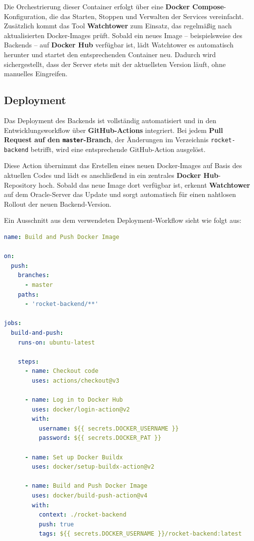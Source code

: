 \documentclass[11pt,a4paper]{article}
\begin{document}
Die Orchestrierung dieser Container erfolgt über eine \textbf{Docker Compose}-Konfiguration, die das Starten, Stoppen und Verwalten der Services vereinfacht. Zusätzlich kommt das Tool \textbf{Watchtower} zum Einsatz, das regelmäßig nach aktualisierten Docker-Images prüft. Sobald ein neues Image – beispielsweise des Backends – auf \textbf{Docker Hub} verfügbar ist, lädt Watchtower es automatisch herunter und startet den entsprechenden Container neu. Dadurch wird sichergestellt, dass der Server stets mit der aktuellsten Version läuft, ohne manuelles Eingreifen.

\subsection{Deployment}

Das Deployment des Backends ist vollständig automatisiert und in den Entwicklungsworkflow über \textbf{GitHub-Actions}\cite{github} integriert. Bei jedem \textbf{Pull Request auf den \texttt{master}-Branch}, der Änderungen im Verzeichnis \texttt{rocket-backend} betrifft, wird eine entsprechende GitHub-Action ausgelöst.

Diese Action übernimmt das Erstellen eines neuen Docker-Images auf Basis des aktuellen Codes und lädt es anschließend in ein zentrales \textbf{Docker Hub}-Repository hoch. Sobald das neue Image dort verfügbar ist, erkennt \textbf{Watchtower} auf dem Oracle-Server das Update und sorgt automatisch für einen nahtlosen Rollout der neuen Backend-Version.

Ein Ausschnitt aus dem verwendeten Deployment-Workflow sieht wie folgt aus:

\begin{lstlisting}[language=yaml, caption={GitHub Action zur automatisierten Bereitstellung}, label={lst:deployment}]
name: Build and Push Docker Image

on:
  push:
    branches:
      - master
    paths:
      - 'rocket-backend/**'

jobs:
  build-and-push:
    runs-on: ubuntu-latest

    steps:
      - name: Checkout code
        uses: actions/checkout@v3

      - name: Log in to Docker Hub
        uses: docker/login-action@v2
        with:
          username: ${{ secrets.DOCKER_USERNAME }}
          password: ${{ secrets.DOCKER_PAT }}

      - name: Set up Docker Buildx
        uses: docker/setup-buildx-action@v2

      - name: Build and Push Docker Image
        uses: docker/build-push-action@v4
        with:
          context: ./rocket-backend
          push: true
          tags: ${{ secrets.DOCKER_USERNAME }}/rocket-backend:latest
\end{lstlisting}
\end{document}

